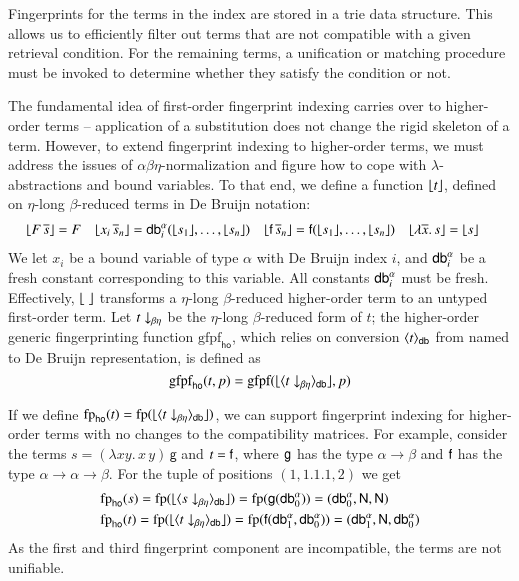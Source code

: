 Fingerprints for the terms in the index are stored in a trie data structure.
This allows us to efficiently filter out terms that are not compatible with a given
retrieval condition. For the remaining terms, a unification or matching
procedure must be invoked to determine whether they satisfy the condition or not.

The fundamental idea of first-order fingerprint indexing carries over to
higher-order terms -- 
application of a substitution does not change the rigid skeleton of a term.
However, to extend fingerprint indexing to
higher-order terms, we must address the issues of $\alpha\beta\eta$-normalization and figure how to cope with $\lambda$-abstractions and
bound variables. To that end, we define a function $\lfloor t\rfloor$, defined on
$\eta$-long $\beta$-reduced terms in De Bruijn \cite{db-75-dbindices} notation:
\begin{align*}
& \lfloor F \, \overline{s}\rfloor = F
&& \lfloor x_i \, \overline{s}_n \rfloor = \textsf{db}_{i}^{\alpha}(\lfloor s_1\rfloor, \ldots, \lfloor s_n\rfloor)
&& \lfloor\mathsf{f} \, \overline{s}_n \rfloor = \mathsf{f}(\lfloor s_1\rfloor, \ldots, \lfloor s_n\rfloor) &&
\lfloor\lambda \overline{x}. \, s  \rfloor = \lfloor s\rfloor
\end{align*}
We let $x_i$ be a bound variable of type $\alpha$ with De Bruijn index $i$,
and $\textsf{db}_{i}^{\alpha}$ be a fresh constant corresponding to this variable. All constants
$\textsf{db}_{i}^{\alpha}$ must be fresh. 
Effectively, $\lfloor\;\rfloor$ transforms a $\eta$-long $\beta$-reduced higher-order term to an untyped first-order term. Let $\nf{t}{\beta\eta}$ be
the $\eta$-long $\beta$-reduced form of $t$; the higher-order generic
fingerprinting function $\text{gfpf}_\textsf{ho}$, which relies on conversion $\langle t \rangle_\textsf{db}$ from
named to De Bruijn representation, is defined as
\[
  \text{gfpf}_\textsf{ho}(t,p) =
    \text{gfpf}(\hotofo{\nametodb{\nf{t}{\beta\eta}}}, p)
\]

If we define $\text{fp}_\textsf{ho}(t) =
\text{fp}(\hotofo{\nametodb{\nf{t}{\beta\eta}}})$, we can support fingerprint indexing
for higher-order terms with no changes to the compatibility matrices. For example,
consider the terms $s = (\lambda x y. \, x \, y) \, \textsf{g}$ and $t = \mathsf{f}$,
where $\mathsf{g}$ has the type $\alpha \rightarrow \beta$ and $\mathsf{f}$ has the
type $\alpha \rightarrow \alpha \rightarrow \beta$. 
For the tuple of
positions $(1, 1.1.1, 2)$ we get
\begin{align*}
  & \text{fp}_\textsf{ho}(s) =
    \text{fp}(\hotofo{\nametodb{\nf{s}{\beta\eta}}}) =
    \text{fp}(\cst{g}(\cstdba{0})) = 
    (\cstdba{0}, \NN, \NN) \\
  & \text{fp}_\textsf{ho}(t) =
   \text{fp}(\hotofo{\nametodb{\nf{t}{\beta\eta}}}) =
    \text{fp}(\cst{f}(\cstdba{1}, \cstdba{0})) = 
    (\cstdba{1}, \NN, \cstdba{0})
\end{align*}
As the first and third fingerprint component are incompatible, the terms are not unifiable.

